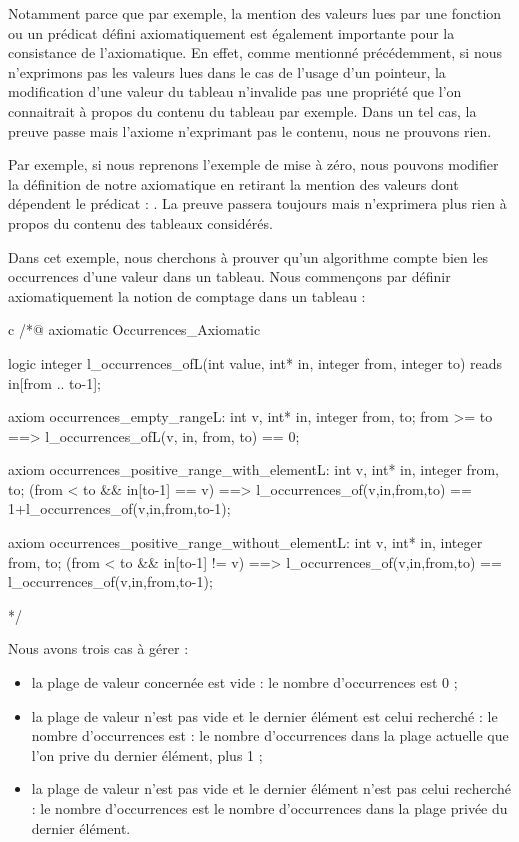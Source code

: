 Notamment parce que par exemple, la mention des valeurs lues par une fonction
ou un prédicat défini axiomatiquement est également importante pour la 
consistance de l'axiomatique. En effet, comme mentionné précédemment, si nous
n'exprimons pas les valeurs lues dans le cas de l'usage d'un pointeur, la 
modification d'une valeur du tableau n'invalide pas une propriété que l'on 
connaitrait à propos du contenu du tableau par exemple. Dans un tel cas, la 
preuve passe mais l'axiome n'exprimant pas le contenu, nous ne prouvons rien.



Par exemple, si nous reprenons l'exemple de mise à zéro, nous pouvons modifier
la définition de notre axiomatique en retirant la mention des valeurs dont 
dépendent le prédicat : . La preuve passera toujours
mais n'exprimera plus rien à propos du contenu des tableaux considérés.





Dans cet exemple, nous cherchons à prouver qu'un algorithme compte bien les 
occurrences d'une valeur dans un tableau. Nous commençons par définir 
axiomatiquement la notion de comptage dans un tableau :



\begin{CodeBlock}{c}
/*@
  axiomatic Occurrences_Axiomatic{
    logic integer l_occurrences_of{L}(int value, int* in, integer from, integer to)
      reads in[from .. to-1];

    axiom occurrences_empty_range{L}:
      \forall int v, int* in, integer from, to;
        from >= to ==> l_occurrences_of{L}(v, in, from, to) == 0;

    axiom occurrences_positive_range_with_element{L}:
      \forall int v, int* in, integer from, to;
        (from < to && in[to-1] == v) ==>
      l_occurrences_of(v,in,from,to) == 1+l_occurrences_of(v,in,from,to-1);

    axiom occurrences_positive_range_without_element{L}:
      \forall int v, int* in, integer from, to;
        (from < to && in[to-1] != v) ==>
      l_occurrences_of(v,in,from,to) == l_occurrences_of(v,in,from,to-1);
  }
*/
\end{CodeBlock}



Nous avons trois cas à gérer :



\begin{itemize}
\item la plage de valeur concernée est vide : le nombre d'occurrences est 0 ;
\item la plage de valeur n'est pas vide et le dernier élément est celui recherché :
le nombre d'occurrences est : le nombre d'occurrences dans la plage actuelle que
l'on prive du dernier élément, plus 1 ;
\item la plage de valeur n'est pas vide et le dernier élément n'est pas celui 
recherché : le nombre d'occurrences est le nombre d'occurrences dans la plage
privée du dernier élément.
\end{itemize}


